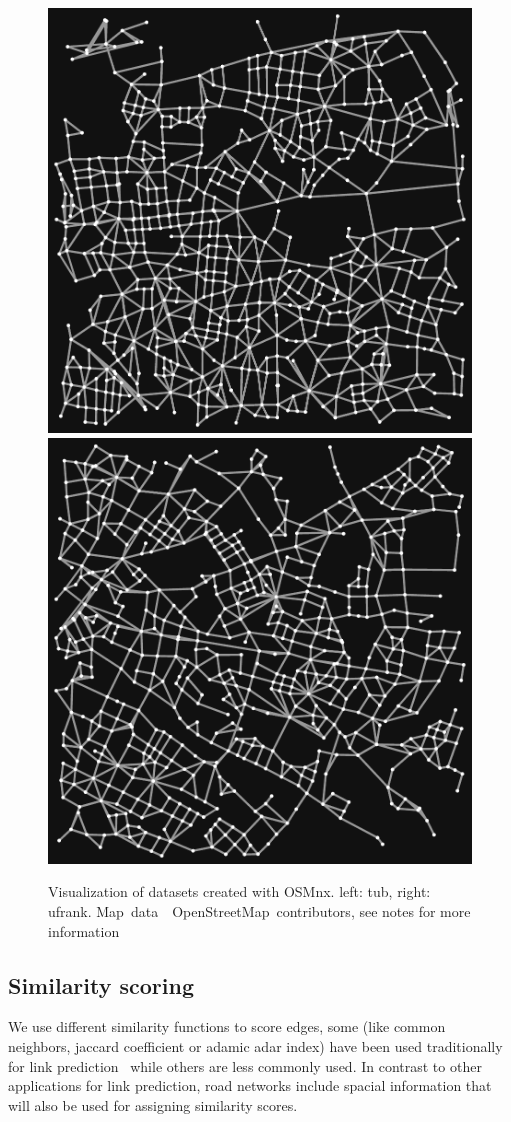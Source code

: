 \documentclass[12pt,a4paper]{IEEEtran}
\newcommand{\osmattribute}[1][]{\mbox{#1 \textrm{\textcopyright} OpenStreetMap contributors}}
\begin{document}
\begin{figure}[tb]
\centering
\includegraphics[width=.485\columnwidth]{graphics/tub.pdf}%
\hfill%
\includegraphics[width=.485\columnwidth]{graphics/ufrank.pdf}
\caption{Visualization of datasets created with OSMnx. left: tub, right: ufrank.
\osmattribute[Map data], see notes for more information}
\label{fig:datasets}
\end{figure}

\subsection{Similarity scoring}\label{subsec:similarity_scoring}

We use different similarity functions to score edges, some (like common neighbors, jaccard coefficient or adamic adar index)
have been used traditionally for link prediction~\cite[see][1021]{social_link_prediction}
while others are less commonly used.
In contrast to other applications for link prediction, road networks include spacial information
that will also be used for assigning similarity scores.
\end{document}
